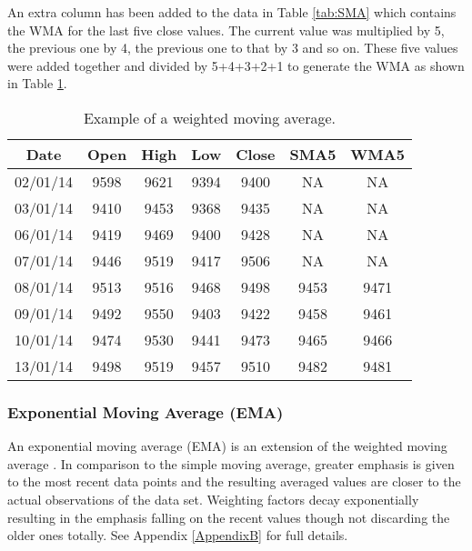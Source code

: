An extra column has been added to the data in Table \ref{tab:SMA} which contains the WMA for the last five close values. The current value was multiplied by 5, the previous one by 4, the previous one to that by 3 and so on. These five values were added together and divided by 5+4+3+2+1 to generate the WMA as shown in Table \ref{tab:WMA}.

\begin{table}[htbp]
  \centering
  \caption[Example of a Weighted Moving Average]{Example of a weighted moving average.}
    \begin{tabular}{ccccccc}
    \toprule
    \textbf{Date} & \textbf{Open} & \textbf{High} & \textbf{Low} & \textbf{Close} & \textbf{SMA5} & \textbf{WMA5} \\
    \midrule
    02/01/14 & 9598  & 9621  & 9394  & 9400  &  NA   & NA  \\
    03/01/14 & 9410  & 9453  & 9368  & 9435  &  NA   & NA \\
    06/01/14 & 9419  & 9469  & 9400  & 9428  &  NA   & NA \\
    07/01/14 & 9446  & 9519  & 9417  & 9506  &  NA   & NA \\
    08/01/14 & 9513  & 9516  & 9468  & 9498  & 9453  & 9471 \\
    09/01/14 & 9492  & 9550  & 9403  & 9422  & 9458  & 9461 \\
    10/01/14 & 9474  & 9530  & 9441  & 9473  & 9465  & 9466 \\
    13/01/14 & 9498  & 9519  & 9457  & 9510  & 9482  & 9481 \\
    \bottomrule
    \end{tabular}%
  \label{tab:WMA}%
\end{table}%

\subsubsection{Exponential Moving Average (EMA)}
An exponential moving average (EMA) is an extension of the weighted moving average \citep{Ord20041}. In comparison to the simple moving average, greater emphasis is given to the most recent data points and the resulting averaged values are closer to the actual observations of the data set. Weighting factors decay exponentially resulting in the emphasis falling on the recent values though not discarding the older ones totally. See Appendix \ref{AppendixB} for full details.


